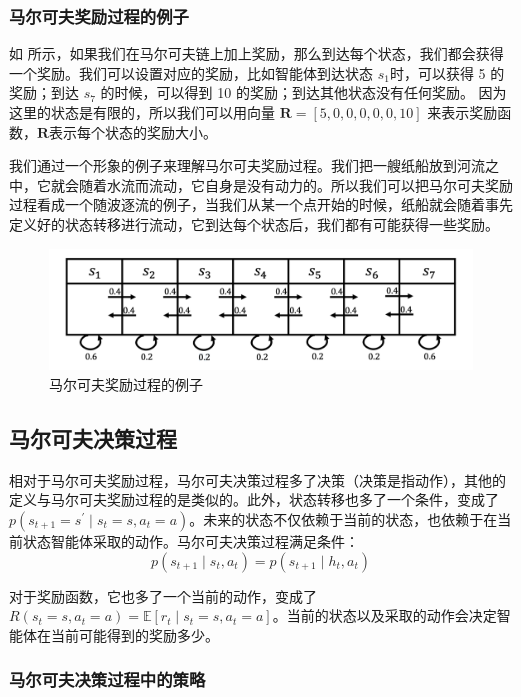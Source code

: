\subsubsection{马尔可夫奖励过程的例子} 

如 所示，如果我们在马尔可夫链上加上奖励，那么到达每个状态，我们都会获得一个奖励。我们可以设置对应的奖励，比如智能体到达状态 $s_1$时，可以获得 5 的奖励；到达 $s_7$ 的时候，可以得到 10 的奖励；到达其他状态没有任何奖励。
因为这里的状态是有限的，所以我们可以用向量 $\boldsymbol{R}=[5,0,0,0,0,0,10]$ 来表示奖励函数，$\boldsymbol{R}$表示每个状态的奖励大小。

我们通过一个形象的例子来理解马尔可夫奖励过程。我们把一艘纸船放到河流之中，它就会随着水流而流动，它自身是没有动力的。所以我们可以把马尔可夫奖励过程看成一个随波逐流的例子，当我们从某一个点开始的时候，纸船就会随着事先定义好的状态转移进行流动，它到达每个状态后，我们都有可能获得一些奖励。

\begin{figure}[hbt]
  \centering
  \includegraphics[width=0.5\linewidth]{res/ch2/2.8}
  \caption{马尔可夫奖励过程的例子}
  \label{fig:mrp_example}
\end{figure}

\subsection{马尔可夫决策过程} 
相对于马尔可夫奖励过程，马尔可夫决策过程多了决策（决策是指动作），其他的定义与马尔可夫奖励过程的是类似的。此外，状态转移也多了一个条件，变成了$p\left(s_{t+1}=s^{\prime} \mid s_{t}=s,a_{t}=a\right)$。未来的状态不仅依赖于当前的状态，也依赖于在当前状态智能体采取的动作。马尔可夫决策过程满足条件：
\begin{equation}
  \label{eq:}
  p\left(s_{t+1} \mid s_{t}, a_{t}\right) =p\left(s_{t+1} \mid h_{t}, a_{t}\right)   
\end{equation}

对于奖励函数，它也多了一个当前的动作，变成了 $R\left(s_{t}=s, a_{t}=a\right)=\mathbb{E}\left[r_{t} \mid s_{t}=s, a_{t}=a\right]$。当前的状态以及采取的动作会决定智能体在当前可能得到的奖励多少。


\subsubsection{马尔可夫决策过程中的策略} 


